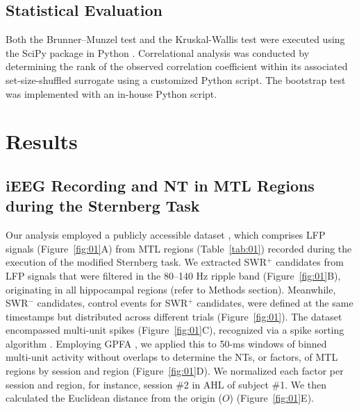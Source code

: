 \documentclass[preprint,review,12pt]{elsarticle}%
\providecommand{\DIFaddbegin}{} %
\providecommand{\DIFaddend}{} %
\newcommand{\DIFaddincludegraphics}[2][]{{\color{blue}\fbox{\DIFOincludegraphics[#1]{#2}}}} %
\DeclareRobustCommand{\DIFaddbegin}{\DIFOaddbegin \let\includegraphics\DIFaddincludegraphics} %
\DeclareRobustCommand{\DIFaddend}{\DIFOaddend \let\includegraphics\DIFOincludegraphics} %
\begin{document}
\subsection{Statistical Evaluation}
Both the Brunner--Munzel test and the Kruskal-Wallis test were executed using the SciPy package in Python \cite{virtanen_scipy_2020}. Correlational analysis was conducted by determining the rank of the observed correlation coefficient within its associated set-size-shuffled surrogate using a customized Python script. The bootstrap test was implemented with an in-house Python script.
\label{sec:methods}
\DIFaddbegin 

\DIFaddend %
\section{Results}
\subsection{iEEG Recording and NT in MTL Regions during the Sternberg Task}
Our analysis employed a publicly accessible dataset \cite{boran_dataset_2020}, which comprises LFP signals (Figure~\ref{fig:01}A) from MTL regions (Table~\ref{tab:01}) recorded during the execution of the modified Sternberg task. We extracted SWR$^+$ candidates from LFP signals that were filtered in the 80--140 Hz ripple band (Figure~\ref{fig:01}B), originating in all hippocampal regions (refer to Methods section). Meanwhile, SWR$^-$ candidates, control events for SWR$^+$ candidates, were defined at the same timestamps but distributed across different trials (Figure~\ref{fig:01}). The dataset encompassed multi-unit spikes (Figure~\ref{fig:01}C), recognized via a spike sorting algorithm \cite{niediek_reliable_2016}. Employing GPFA \cite{yu_gaussian-process_2009}, we applied this to 50-ms windows of binned multi-unit activity without overlaps to determine the NTs, or factors, of MTL regions by session and region (Figure~\ref{fig:01}D). We normalized each factor per session and region, for instance, session \#2 in AHL of subject \#1. We then calculated the Euclidean distance from the origin ($O$) (Figure~\ref{fig:01}E).
\end{document}
